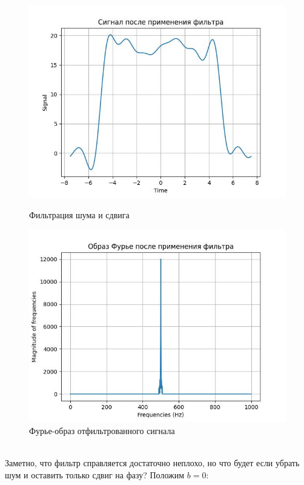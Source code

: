       \begin{figure}[!htb]
          \includegraphics[width=\linewidth]{../images/result/spec_freq.jpeg}
          \caption{Фильтрация шума и сдвига}
        \endminipage\hfill
          \includegraphics[width=\linewidth]{../images/result/spec_freq_fourier.jpeg}
          \caption{Фурье-образ отфильтрованного сигнала}
        \endminipage\hfill
        \end{figure}
        \\
        \noindent Заметно, что фильтр справляется достаточно неплохо, но что будет если убрать шум и оставить только сдвиг на фазу? Положим $b = 0$:
       \newpage
